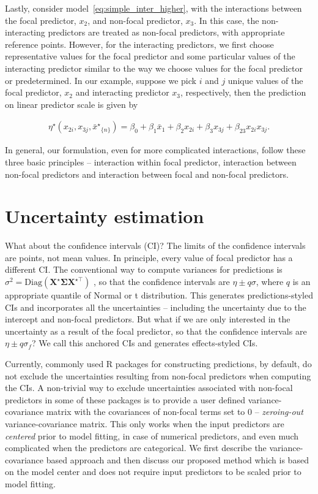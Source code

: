 \documentclass[10pt,letterpaper]{article}
\let\proglang=\textsf
\newcommand{\bX}{{\mathbf X}}
\newcommand{\nset}[1]{#1_{\{n\}}}
\begin{document}
Lastly, consider model~\ref{eq:simple_inter_higher}, with the interactions between the focal predictor, $x_2$, and non-focal predictor, $x_3$. In this case, the non-interacting predictors are treated as non-focal predictors, with appropriate reference points. However, for the interacting predictors, we first choose representative values for the focal predictor and some particular values of the interacting predictor similar to the way we choose values for the focal predictor or predetermined. In our example, suppose we pick $i$ and $j$ unique values of the focal predictor, $x_2$ and interacting predictor $x_3$, respectively, then the prediction on linear predictor scale is given by

\begin{align*}
\eta^\star(x_{2i}, x_{3j}, \nset{{\bar{x}^\star}}) = \beta_0 + \beta_1 \bar{x}_1 + \beta_2x_{2i} + \beta_3x_{3j} + \beta_{23}x_{2i}x_{3j}.
\end{align*}

In general, our formulation, even for more complicated interactions, follow these three basic principles -- interaction within focal predictor, interaction between non-focal predictors and interaction between focal and non-focal predictors.


\section*{Uncertainty estimation}

What about the confidence intervals (CI)? The limits of the confidence intervals are points, not mean values. In principle, every value of focal predictor has a different CI. The conventional way to compute variances for predictions is $\sigma^2 = \textrm{Diag}(\bX^\star \boldsymbol{\Sigma} \bX^{\star\top})$ \cite{lenth2018package, fox2009effect}, so that the confidence intervals are $\eta \pm q\sigma$, where $q$ is an appropriate quantile of Normal or t distribution. This generates predictions-styled CIs and incorporates all the uncertainties -- including the uncertainty due to the intercept and non-focal predictors.  But what if we are only interested in the uncertainty as a result of the focal predictor, so that the confidence intervals are $\eta \pm q \sigma_f$? We call this anchored CIs and generates effects-styled CIs.

Currently, commonly used \proglang{R} packages for constructing predictions, by default, do not exclude the uncertainties resulting from non-focal predictors when computing the CIs. A non-trivial way to exclude uncertainties associated with non-focal predictors in some of these packages is to provide a user defined variance-covariance matrix with the covariances of non-focal terms set to $0$ -- \emph{zeroing-out} variance-covariance matrix. This only works when the input predictors are \emph{centered} prior to model fitting, in case of numerical predictors, and even much complicated when the predictors are categorical. We first describe the variance-covariance based approach and then discuss our proposed method which is based on the model center and does not require input predictors to be scaled prior to model fitting.
\end{document}
